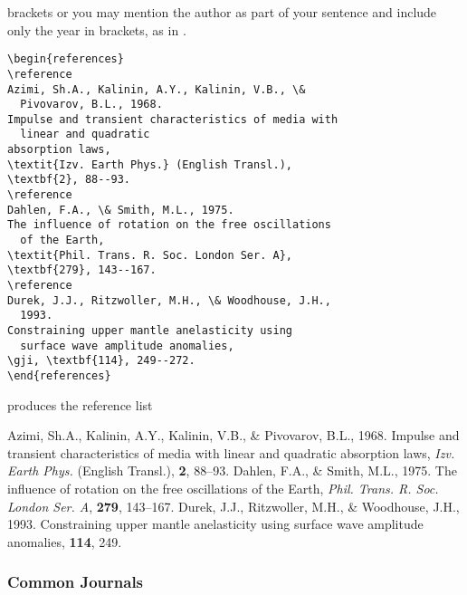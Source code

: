 brackets  or you may mention the author as part
of your sentence and include only the year in brackets, as in .

\begin{verbatim}
\begin{references}
\reference
Azimi, Sh.A., Kalinin, A.Y., Kalinin, V.B., \&
  Pivovarov, B.L., 1968.
Impulse and transient characteristics of media with
  linear and quadratic
absorption laws,
\textit{Izv. Earth Phys.} (English Transl.),
\textbf{2}, 88--93.
\reference
Dahlen, F.A., \& Smith, M.L., 1975.
The influence of rotation on the free oscillations
  of the Earth,
\textit{Phil. Trans. R. Soc. London Ser. A},
\textbf{279}, 143--167.
\reference
Durek, J.J., Ritzwoller, M.H., \& Woodhouse, J.H.,
  1993.
Constraining upper mantle anelasticity using
  surface wave amplitude anomalies,
\gji, \textbf{114}, 249--272.
\end{references}
\end{verbatim}
produces the reference list
\begin{references}
Azimi, Sh.A., Kalinin, A.Y., Kalinin, V.B., \& Pivovarov, B.L., 1968.
Impulse and transient characteristics of media with linear and  quadratic
absorption laws,
\textit{Izv. Earth Phys.} (English Transl.),
\textbf{2}, 88--93.
Dahlen, F.A., \& Smith, M.L., 1975.
The influence of rotation on the free oscillations of the Earth,
\textit{Phil. Trans. R. Soc. London Ser. A}, \textbf{279}, 143--167.
Durek, J.J., Ritzwoller, M.H., \& Woodhouse, J.H., 1993. Constraining upper
mantle anelasticity using surface wave amplitude anomalies, \gji{} \textbf{114},
249.
\end{references}

\subsubsection{Common Journals}

